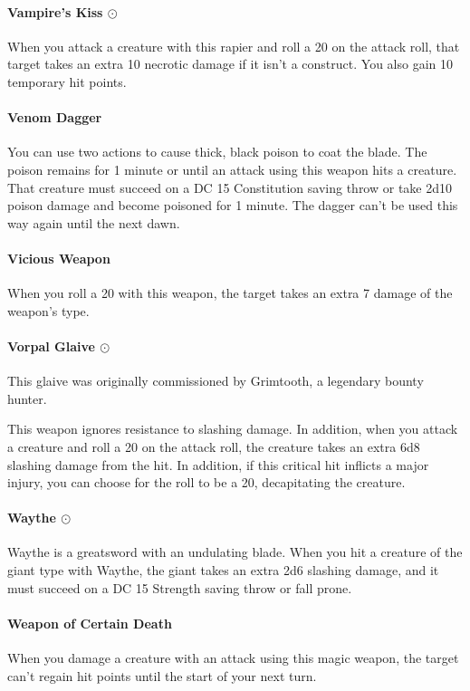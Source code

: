     \paragraph{Vampire's Kiss $\odot$}
        When you attack a creature with this rapier and roll a 20 on the attack roll, that target takes an extra 10 necrotic damage if it isn't a construct.
        You also gain 10 temporary hit points.
    \paragraph{Venom Dagger}
        You can use two actions to cause thick, black poison to coat the blade.
        The poison remains for 1 minute or until an attack using this weapon hits a creature.
        That creature must succeed on a DC 15 Constitution saving throw or take 2d10 poison damage and become poisoned for 1 minute.
        The dagger can't be used this way again until the next dawn.
    \paragraph{Vicious Weapon}
        When you roll a 20 with this weapon, the target takes an extra 7 damage of the weapon's type.
    \paragraph{Vorpal Glaive $\odot$}
        This glaive was originally commissioned by Grimtooth, a legendary bounty hunter.

        This weapon ignores resistance to slashing damage.
        In addition, when you attack a creature and roll a 20 on the attack roll, the creature takes an extra 6d8 slashing damage from the hit.
        In addition, if this critical hit inflicts a major injury, you can choose for the roll to be a 20, decapitating the creature.
    \paragraph{Waythe $\odot$}
        Waythe is a greatsword with an undulating blade.
        When you hit a creature of the giant type with Waythe, the giant takes an extra 2d6 slashing damage, and it must succeed on a DC 15 Strength saving throw or fall prone.
    \paragraph{Weapon of Certain Death}
        When you damage a creature with an attack using this magic weapon, the target can't regain hit points until the start of your next turn.
